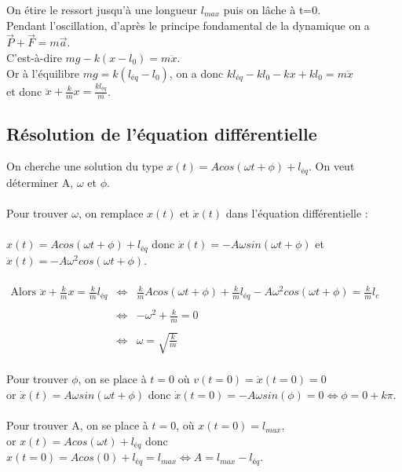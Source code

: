 \documentclass[a4paper,10pt]{book}
\begin{document}
On étire le ressort jusqu'à une longueur $l_{max}$ puis on lâche à t=0.\\

Pendant l'oscillation, d'après le principe fondamental de la dynamique on a $\vec{P}+\vec{F}=m\vec{a}$.\\
C'est-à-dire $mg-k(x-l_{0})=m\ddot{x}$.\\

Or à l'équilibre $mg=k(l_{éq}-l_{0})$, on a donc $kl_{éq}-kl_{0}-kx+kl_{0}=m\ddot{x}$\\
et donc $\ddot{x}+\frac{k}{m}x=\frac{kl_{éq}}{m}$.\\

\newpage

\subsection{Résolution de l'équation différentielle}
On cherche une solution du type $x(t)=Acos(\omega t+\phi)+l_{éq}$. On veut déterminer A, $\omega$ et $\phi$.\\\\

Pour trouver $\omega$, on remplace $x(t)$ et $\ddot{x}(t)$ dans l'équation différentielle :\\\\
$x(t)=Acos(\omega t +\phi )+l_{éq}$ donc $\dot{x}(t)=-A\omega sin(\omega t +\phi)$ et $\ddot{x}(t)=-A\omega^{2} cos(\omega t +\phi)$.\\\\
$\begin{array}{rcl} \text{Alors }\ddot{x}+\frac{k}{m}x=\frac{k}{m}l_{éq} &\Leftrightarrow &\frac{k}{m}Acos(\omega t +\phi )+\frac{k}{m}l_{éq}-A\omega^{2} cos(\omega t +\phi )=\frac{k}{m}l_{e}\\\\
&\Leftrightarrow& -\omega^{2}+\frac{k}{m}=0\\\\
&\Leftrightarrow& \omega =\sqrt{\frac{k}{m}}\end{array}$\\\\

Pour trouver $\phi$, on se place à $t=0$ où $v(t=0)=\dot{x}(t=0)=0$\\
or $\dot{x}(t)=A\omega sin(\omega t+\phi )$ donc $\dot{x}(t=0)=-A\omega sin(\phi)=0 \Leftrightarrow \phi= 0+k\pi$.\\\\

Pour trouver A, on se place à $t=0$, où $x(t=0)=l_{max}$,\\
or $x(t)=Acos(\omega t)+l_{éq}$ donc $x(t=0)=A cos(0)+l_{éq}=l_{max} \Leftrightarrow A=l_{max}-l_{éq}$.\\\\
\end{document}
